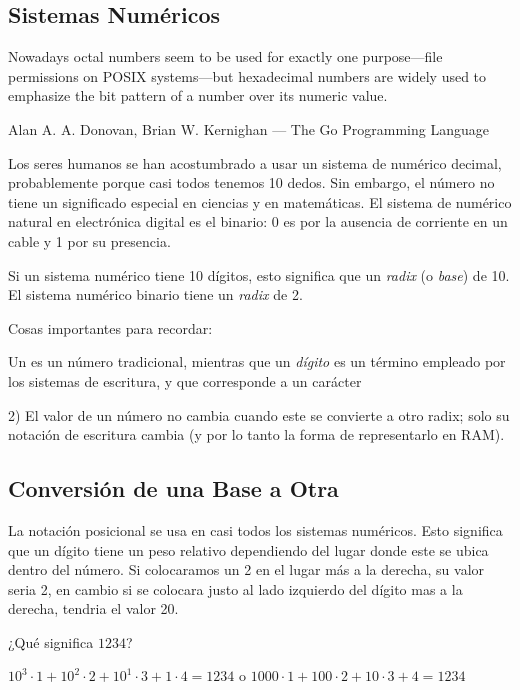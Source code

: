 \subsection{Sistemas Numéricos}

\epigraph{Nowadays octal numbers seem to be
used for exactly one purpose---file permissions on POSIX systems---but hexadecimal numbers
are widely used to emphasize the bit pattern of a number over its numeric value.}
{Alan A. A. Donovan, Brian W. Kernighan ---  The Go Programming Language}

Los seres humanos se han acostumbrado a usar un sistema de numérico decimal, probablemente porque casi todos tenemos 10 dedos.
Sin embargo, el número  no tiene un significado especial en ciencias y en matemáticas.
El sistema de numérico natural en electrónica digital es el binario: 0 es por la ausencia de corriente en un cable y 1 por su presencia.

Si un sistema numérico tiene 10 dígitos, esto significa que un \emph{radix} (o \emph{base}) de 10.
El sistema numérico binario tiene un \emph{radix} de 2.

Cosas importantes para recordar:

Un  es un número tradicional, mientras que un \emph{dígito} es un término empleado por los sistemas de escritura, y que corresponde a un carácter

2) El valor de un número no cambia cuando este se convierte a otro radix; solo su notación de escritura cambia (y por lo tanto la forma de representarlo en \ac {RAM}).

\subsection{Conversión de una Base a Otra}

La notación posicional se usa en casi todos los sistemas numéricos. Esto significa que un dígito tiene un peso relativo dependiendo del lugar donde este se ubica dentro del número.
Si colocaramos un 2 en el lugar más a la derecha, su valor seria 2, en cambio si se colocara justo al lado izquierdo del dígito mas a la derecha, tendria el valor 20.

¿Qué significa $1234$?

$10^3 \cdot 1 + 10^2 \cdot 2 + 10^1 \cdot 3 + 1 \cdot 4 = 1234$ o
$1000 \cdot 1 + 100 \cdot 2 + 10 \cdot 3 + 4 = 1234$

